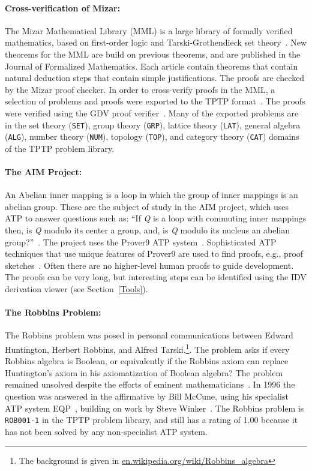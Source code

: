 \documentclass[runningheads]{llncs}
\begin{document}
\paragraph{Cross-verification of Mizar:}
The Mizar Mathematical Library (MML) is a large library of formally verified mathematics,
based on first-order logic and Tarski-Grothendieck set theory~\cite{GKN10}.
New theorems for the MML are build on previous theorems, and are published in the 
Journal of Formalized Mathematics.
Each article contain theorems that contain natural deduction steps that contain simple 
justifications. 
The proofs are checked by the Mizar proof checker.
In order to cross-verify proofs in the MML, a selection of problems and proofs were exported to
the TPTP format~\cite{US09}.
The proofs were verified using the GDV proof verifier~\cite{Sut06}.
Many of the exported problems are in the set theory ({\tt SET}), group theory ({\tt GRP}),
lattice theory ({\tt LAT}), general algebra ({\tt ALG}), number theory ({\tt NUM}), topology 
({\tt TOP}), and category theory ({\tt CAT}) domains of the TPTP problem library.

\paragraph{The AIM Project:}
An Abelian inner mapping is a loop in which the group of inner mappings is an abelian group. 
These are the subject of study in the AIM project, which uses ATP to answer questions such as:
``If {\em Q} is a loop with commuting inner mappings then, is {\em Q} modulo its center a group, 
and, is {\em Q} modulo its nucleus an abelian group?''~\cite{KVV13}.
The project uses the Prover9 ATP system~\cite{McC-Prover9-URL}.
Sophisticated ATP techniques that use unique features of Prover9 are used to find proofs, e.g., 
proof sketches~\cite{Ver01-JAR}.
Often there are no higher-level human proofs to guide development.
The proofs can be very long, but interesting steps can be identified using the IDV derivation
viewer (see Section~\ref{Tools}).

\paragraph{The Robbins Problem:}
The Robbins problem was posed in personal communications between Edward Huntington,
Herbert Robbins, and Alfred Tarski.\footnote{%
The background is given in
\href{https://en.wikipedia.org/wiki/Robbins_algebra}{en.wikipedia.org/wiki/Robbins\_algebra}}.
The problem asks if every Robbins algebra is Boolean, or equivalently if the Robbins axiom 
can replace Huntington's axiom in his axiomatization of Boolean algebra?
The problem remained unsolved despite the efforts of eminent mathematicians~\cite{HMT71}.
In 1996 the question was answered in the affirmative by Bill McCune, using his specialist
ATP system EQP~\cite{McC97}, building on work by Steve Winker~\cite{Win90}.
The Robbins problem is {\tt ROB001-1} in the TPTP problem library, and still has a rating of 
1.00 because it has not been solved by any non-specialist ATP system.
\end{document}
